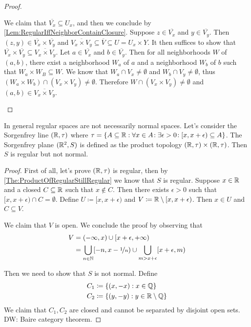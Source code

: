 \documentclass[screen,single]{techreport}
\numberwithin{equation}{section}
\newcommand{\diw}[1]{{\color{Red} DW: #1}}
\begin{document}
\begin{proof}
\begin{itemize}
		We claim that $\overline{V_x} \subseteq U_x$, and then we conclude by \cref{Lem:RegularIffNeighborContainClosure}.
		Suppose $z \in \overline{V_x}$ and $y \in \overline{V_y}$.
		Then $(z,y) \in \overline{V_x} \times \overline{V_y}$ and $\overline{V_x \times V_y} \subseteq \overline{V} \subseteq U = U_x \times Y$.
		It then suffices to show that $\overline{V_x} \times \overline{V_y} \subseteq \overline{V_x \times V_y}$.
		Let $a \in \overline{V_x}$ and $b \in \overline{V_y}$.
		Then for all neighborhoods $W$ of $(a,b)$, there exist a neighborhood $W_a$ of $a$ and a neighborhood $W_b$ of $b$ such that $W_a \times W_B \subseteq W$.
		We know that $W_a \cap V_x \neq \emptyset$ and $W_b \cap V_y \neq \emptyset$,
		thus $(W_a \times W_b) \cap (V_x \times V_y) \neq \emptyset$.
		Therefore $W \cap (V_x \times V_y) \neq \emptyset$ and $(a,b) \in \overline{V_x\times V_y}$.
	\end{itemize}
\end{proof}

\begin{example}\label{Exa:RegularNotImplyNormal}
	In general regular spaces are not necessarily normal spaces.
	Let's consider the Sorgenfrey line $(\mathbb{R},\tau)$ where $\tau = \{ A \subseteq \mathbb{R} : \forall {x \in A}\!: \exists {\epsilon > 0}\!: [x,x+\epsilon) \subseteq A \}$.
	The Sorgenfrey plane $(\mathbb{R}^2,S)$ is defined as the product topology $(\mathbb{R},\tau) \times (\mathbb{R},\tau)$.
	Then $S$ is regular but not normal.
\end{example}
\begin{proof}
	First of all, let's prove $(\mathbb{R},\tau)$ is regular, then by \cref{The:ProductOfRegularStillRegular} we know that $S$ is regular.
	Suppose $x \in \mathbb{R}$ and a closed $C \subseteq \mathbb{R}$ such that $x \not\in C$.
	Then there exists $\epsilon>0$ such that $[x,x+\epsilon) \cap C = \emptyset$.
	Define $U \coloneqq [x,x+\epsilon)$ and $V \coloneqq \mathbb{R} \setminus [x,x+\epsilon)$.
	Then $x \in U$ and $C \subseteq V$.
	
	We claim that $V$ is open. We conclude the proof by observing that
	\begin{align*}
		V & = (-\infty,x) \cup [x+\epsilon,+\infty) \\
		& = \bigcup_{n \in \mathbb{N}} [-n, x-\nicefrac{1}{n}) \cup \bigcup_{m > x + \epsilon} [x+\epsilon,m)
	\end{align*}
	
	Then we need to show that $S$ is not normal.
	Define
	\begin{align*}
		C_1 & \coloneqq \{ (x,-x) : x \in \mathbb{Q} \} \\
		C_2 & \coloneqq \{ (y,-y) : y \in \mathbb{R} \setminus \mathbb{Q} \}
	\end{align*}
	We claim that $C_1,C_2$ are closed and cannot be separated by disjoint open sets.
	\diw{Baire category theorem.}
\end{proof}
\end{document}
